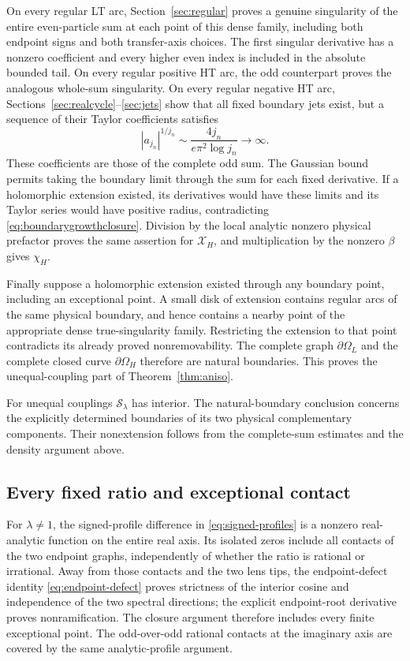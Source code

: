 \documentclass[11pt]{article}
\numberwithin{equation}{section}
\theoremstyle{definition}
\newcommand{\cS}{\mathcal S}
\newcommand{\OH}{\Omega_H}
\newcommand{\OL}{\Omega_L}
\newcommand{\XH}{\mathcal X_H}
\begin{document}
On every regular LT arc, Section~\ref{sec:regular} proves a genuine
singularity of the entire even-particle sum at each point of this dense
family, including both endpoint signs and both transfer-axis choices.
The first singular derivative has a nonzero coefficient and every
higher even index is included in the absolute bounded tail. On every
regular positive HT arc, the odd counterpart proves the analogous
whole-sum singularity. On every regular negative HT arc,
Sections~\ref{sec:realcycle}--\ref{sec:jets} show that all fixed boundary
jets exist, but a sequence of their Taylor coefficients satisfies
\begin{equation}\label{eq:boundarygrowthclosure}
 |a_{j_n}|^{1/j_n}\sim\frac{4j_n}{e\pi^2\log j_n}\longrightarrow\infty.
\end{equation}
These coefficients are those of the complete odd sum. The Gaussian
bound permits taking the boundary limit through the sum for each fixed
derivative. If a holomorphic extension existed, its derivatives would
have these limits and its Taylor series would have positive radius,
contradicting \eqref{eq:boundarygrowthclosure}. Division by the local
analytic nonzero physical prefactor proves the same assertion for
$\XH$, and multiplication by the nonzero $\beta$ gives $\chi_H$.

Finally suppose a holomorphic extension existed through any boundary
point, including an exceptional point. A small disk of extension contains
regular arcs of the same physical boundary, and hence contains a nearby
point of the appropriate dense true-singularity family. Restricting the
extension to that point contradicts its already proved nonremovability.
The complete graph $\partial\OL$ and the complete closed curve
$\partial\OH$ therefore are natural boundaries. This proves
the unequal-coupling part of Theorem~\ref{thm:aniso}.

For unequal couplings $\cS_\lambda$ has interior. The natural-boundary
conclusion concerns the explicitly determined boundaries of its two
physical complementary components. Their nonextension follows from
the complete-sum estimates and the density argument above.

\subsection{Every fixed ratio and exceptional contact}
For $\lambda\ne1$, the signed-profile difference in
\eqref{eq:signed-profiles} is a nonzero real-analytic function on
the entire real axis. Its isolated zeros include all contacts of the
two endpoint graphs, independently of whether the ratio is rational
or irrational. Away from those contacts and the two lens tips, the
endpoint-defect identity \eqref{eq:endpoint-defect} proves strictness
of the interior cosine and independence of the two spectral directions;
the explicit endpoint-root derivative proves nonramification.
The closure argument therefore includes every finite exceptional point.
The odd-over-odd rational contacts at the imaginary axis are covered by
the same analytic-profile argument.
\end{document}
